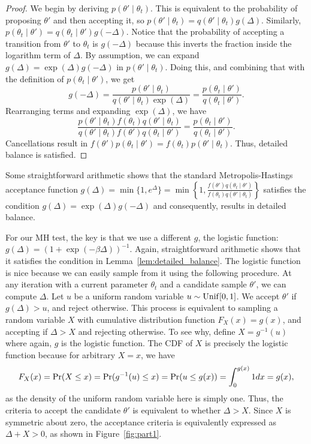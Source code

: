 \documentclass{article}
\begin{document}
\begin{proof}
We begin by deriving $p(\theta' \mid \theta_t)$. This is equivalent to the probability of proposing
$\theta'$ and then accepting it, so $p(\theta' \mid \theta_t) = q(\theta' \mid \theta_t)g(\Delta).$
Similarly, $p(\theta_t \mid \theta') = q(\theta_t \mid \theta')g(-\Delta).$ Notice that the
probability of accepting a transition from $\theta'$ to $\theta_t$ is $g(-\Delta)$ because this
inverts the fraction inside the logarithm term of $\Delta$.  By assumption, we can expand $g(\Delta)
= \exp(\Delta)g(-\Delta)$ in $p(\theta' \mid \theta_t)$. Doing this, and combining that with the
definition of $p(\theta_t \mid \theta')$, we get
\begin{equation}\label{eq:combined}
g(-\Delta) = \frac{p(\theta' \mid \theta_t)}{q(\theta' \mid \theta_t)\exp(\Delta)} = \frac{p(\theta_t \mid \theta')}{q(\theta_t \mid \theta')}.
\end{equation}
Rearranging terms and expanding $\exp(\Delta)$, we have
\begin{equation}\label{eq:rearrange}
\frac{p(\theta' \mid \theta_t) f(\theta_t) q(\theta' \mid \theta_t)}{q(\theta' \mid \theta_t) f(\theta') q(\theta_t \mid \theta')} = \frac{p(\theta_t \mid \theta')}{ q(\theta_t \mid \theta')}.
\end{equation}
Cancellations result in $f(\theta') p(\theta_t \mid \theta') = f(\theta_t) p(\theta' \mid
\theta_t)$. Thus, detailed balance is satisfied.
\end{proof}

Some straightforward arithmetic shows that the standard Metropolis-Hastings acceptance function
$g(\Delta) = \min\{1, e^\Delta \} = \min\left\{1, \frac{f(\theta')q(\theta_t \mid
\theta')}{f(\theta_t)q(\theta' \mid \theta_t)}\right\}$ satisfies the condition $g(\Delta) =
\exp(\Delta)g(-\Delta)$ and consequently, results in detailed balance.

For our MH test, the key is that we use a different $g$, the logistic function: $g(\Delta) =
(1+\exp(-\beta \Delta))^{-1}$. Again, straightforward arithmetic shows that it satisfies the
condition in Lemma~\ref{lem:detailed_balance}.  The logistic function is nice because we can easily
sample from it using the following procedure. At any iteration with a current parameter $\theta_t$
and a candidate sample $\theta'$, we can compute $\Delta$. Let $u$ be a uniform random variable $u
\sim {\rm Unif}[0,1]$. We accept $\theta'$ if $g(\Delta) > u$, and reject otherwise. This process is
equivalent to sampling a random variable $X$ with cumulative distribution function $F_X(x) = g(x)$,
and accepting if $\Delta > X$ and rejecting otherwise. To see why, define $X = g^{-1}(u)$ where
again, $g$ is the logistic function. The CDF of $X$ is precisely the logistic function because for
arbitrary $X = x$, we have
\[
F_X(x) = {\rm Pr}(X \le x) = {\rm Pr}(g^{-1}(u) \le x) = {\rm Pr}(u \le g(x)) = \int_{0}^{g(x)} 1 dx = g(x),
\]
as the density of the uniform random variable here is simply one. Thus, the criteria to accept the
candidate $\theta'$ is equivalent to whether $\Delta > X$. Since $X$ is symmetric about zero, the
acceptance criteria is equivalently expressed as $\Delta + X>0$, as shown in Figure~\ref{fig:part1}.
\end{document}

